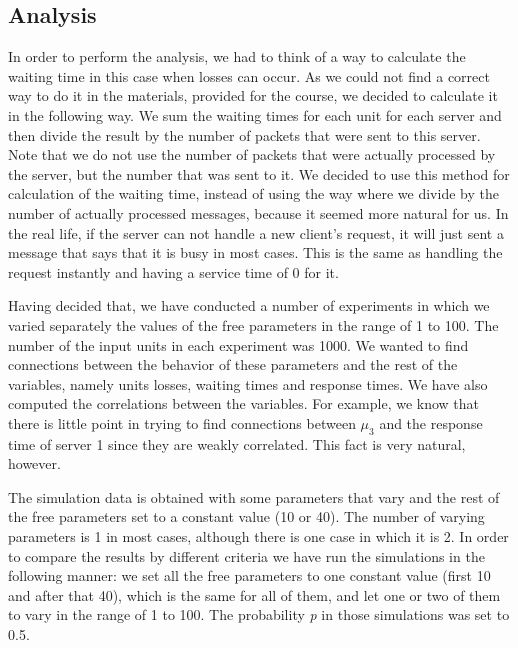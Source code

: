 \documentclass[12pt]{article}
\theoremstyle{plain}
\begin{document}
\subsection*{Analysis}
In order to perform the analysis, we had to think of a way to calculate the
waiting time in this case when losses can occur. As we could not find a correct
way to do it in the materials, provided for the course, we decided to calculate
it in the following way. We sum the waiting times for each unit for each server
and then divide the result by the number of packets that were sent to this 
server. Note that we do not use the number of packets that were actually
processed by the server, but the number that was sent to it. We decided to use
this method for calculation of the waiting time, instead of using the way where we
divide by the number of actually processed messages, because it seemed more 
natural for us. In the real life, if the server can not handle a new client's
request, it will just sent a message that says that it is busy in most cases.
This is the same as handling the request instantly and having a service time of
0 for it.

Having decided that, we have conducted a number of experiments in which we
varied separately the values of the free parameters in the range of 1 to 100.
The number of the input units in each experiment was 1000. We wanted to find
connections between the behavior of these parameters and the rest of the
variables, namely units losses, waiting times and response times. We have also
computed the correlations between the variables. For example, we know that
there is little point in trying to find connections between $\mu_3$ and the
response time of server 1 since they are weakly correlated. This fact is very
natural, however. 

The simulation data is obtained with some parameters that vary and the rest of
the free parameters set to a constant value (10 or 40). The number of varying 
parameters is 1 in most cases, although there is one case in which it is 2. 
In order to compare the results by different criteria we have run the
simulations in the following manner: we set all the free parameters to one
constant value (first 10 and after that 40), which is the same for all of them,
and let one or two of them to vary in the range of 1 to 100. The probability
\emph{p} in those simulations was set to 0.5.  
\end{document}
